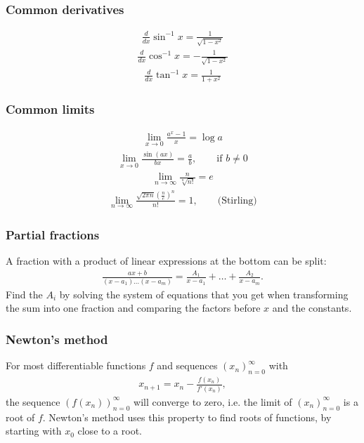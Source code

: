 \subsubsection{Common derivatives}
\begin{align*}
    \frac{d}{dx}\sin^{-1}x = \frac1{\sqrt{1-x^2}}
\end{align*}
\begin{align*}
    \frac{d}{dx}\cos^{-1}x = -\frac1{\sqrt{1-x^2}}
\end{align*}
\begin{align*}
    \frac{d}{dx}\tan^{-1}x = \frac1{1+x^2}
\end{align*}

\subsubsection{Common limits}
\begin{align*}
    \lim_{x \to 0}\frac{a^x - 1}x = \log a
\end{align*}
\begin{align*}
    \lim_{x \to 0} \frac{\sin(ax)}{bx} = \frac ab, \qquad \text{if }b \neq 0
\end{align*}
\begin{align*}
    \lim_{n \to \infty} \frac n{\sqrt[n]{n!}} = e
\end{align*}
\begin{align*}
    \lim_{n \to \infty} \frac{\sqrt{2\pi n}\left(\frac ne\right)^n}{n!} = 1, \qquad \text{(Stirling)}
\end{align*}

\subsubsection{Partial fractions}
A fraction with a product of linear expressions at the bottom can be split:
\begin{align*}
    \frac{ax + b}{(x - a_1)\dots(x - a_m)} = \frac{A_1}{x - a_1} + \dots + \frac{A_2}{x - a_m}.
\end{align*}
Find the $A_i$ by solving the system of equations that you get when transforming the sum into one fraction and comparing the factors before $x$ and the constants.

\subsubsection{Newton's method}
For most differentiable functions $f$ and sequences $(x_n)_{n=0}^\infty$ with
\begin{align*}
    x_{n + 1} = x_n - \frac{f(x_n)}{f'(x_n)},
\end{align*}
the sequence $(f(x_n))_{n=0}^\infty$ will converge to zero, i.e. the limit of $(x_n)_{n=0}^\infty$ is a root of $f$. Newton's method uses this property to find roots of functions, by starting with $x_0$ close to a root.

